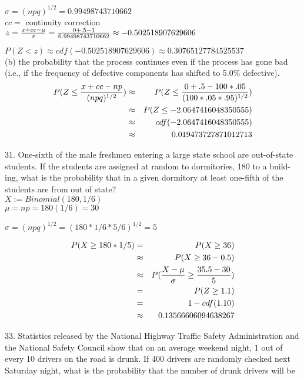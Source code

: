 $\sigma = (npq)^{1/2} = 
0.99498743710662
$ \\

$cc = $ continuity correction \\

$z = \frac{x+ cc - \mu}{\sigma} = \frac{0 + .5 - 1}{
0.99498743710662
} \approx 
-0.502518907629606
$ 

$P(Z < z) \approx cdf(-0.502518907629606) 
\approx 
0.30765127784525537
$ \\

(b) the probability that the process continues even if the process has gone bad (i.e., if the frequency of defective components has shifted to 5.0\% defective). \\

\begin{eqnarray*}
P(Z \leq \frac{x + cc - np}{(npq)^{1/2}})    & \approx & 
P(Z \leq \frac{0 + .5 - 100*.05}{(100*.05*.95)^{1/2}}) \\ & \approx & 
P(Z \leq -2.0647416048350555) \\ & \approx &
cdf(-2.0647416048350555) \\ & \approx & 0.019473727871012713
\end{eqnarray*}

31. One-sixth of the male freshmen entering a large
state school are out-of-state students. If the students
are assigned at random to dormitories, 180 to a build-
ing, what is the probability that in a given dormitory
at least one-fifth of the students are from out of state? \\

$X := Binomial(180,1/6)$ \\

$\mu = np = 180(1/6) = 30$

$\sigma = (npq)^{1/2} = (180 * 1/6 * 5/6)^{1/2} = 5$

\begin{eqnarray*}
P(X \geq 180 * 1/5) & = & P(X \geq 36)  \\
                    & \approx & P(X \geq 36 - 0.5) \\
 & \approx & P(\frac{X - \mu}{\sigma} \geq \frac{35.5 - 30}{5}) \\
& = & P(Z \geq 1.1) \\
& = & 1- cdf(1.10) \\
& \approx & 0.13566606094638267
\end{eqnarray*}

33. Statistics released by the National Highway
Traffic Safety Administration and the National Safety
Council show that on an average weekend night, 1 out
of every 10 drivers on the road is drunk. If 400 drivers
are randomly checked next Saturday night, what is the
probability that the number of drunk drivers will be \\

